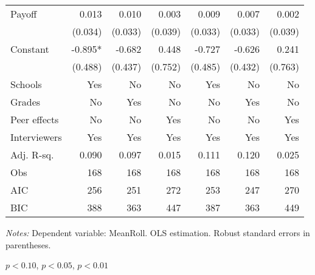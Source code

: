 \begin{table}[htbp]
\begin{adjustbox}{width=1\textwidth}
\begin{threeparttable}
\begin{tabular}{l*{6}{D{.}{.}{-1}}}
Payoff              &               0.013   &               0.010   &               0.003   &               0.009   &               0.007   &               0.002   \\
                    &             (0.034)   &             (0.033)   &             (0.039)   &             (0.033)   &             (0.033)   &             (0.039)   \\
Constant            &              -0.895*  &              -0.682   &               0.448   &              -0.727   &              -0.626   &               0.241   \\
                    &             (0.488)   &             (0.437)   &             (0.752)   &             (0.485)   &             (0.432)   &             (0.763)   \\
Schools             &                 Yes   &                  No   &                  No   &                 Yes   &                  No   &                  No   \\
Grades              &                  No   &                 Yes   &                  No   &                  No   &                 Yes   &                  No   \\
Peer effects        &                  No   &                  No   &                 Yes   &                  No   &                  No   &                 Yes   \\
Interviewers        &                 Yes   &                 Yes   &                 Yes   &                 Yes   &                 Yes   &                 Yes   \\
\midrule
Adj. R-sq.          &               0.090   &               0.097   &               0.015   &               0.111   &               0.120   &               0.025   \\
Obs                 &                 168   &                 168   &                 168   &                 168   &                 168   &                 168   \\
AIC                 &                 256   &                 251   &                 272   &                 253   &                 247   &                 270   \\
BIC                 &                 388   &                 363   &                 447   &                 387   &                 363   &                 449   \\
\bottomrule
\end{tabular}
\begin{tablenotes}
\footnotesize
\item \textit{Notes:} Dependent variable: MeanRoll. OLS estimation. Robust standard errors in parentheses.
\item \sym{*} \(p<0.10\), \sym{**} \(p<0.05\), \sym{***} \(p<0.01\)
\end{tablenotes}
\end{threeparttable}
\end{adjustbox}
\label{tab:cheat_math}
\end{table}